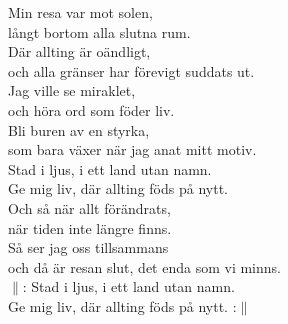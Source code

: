 \documentclass[a6paper,10pt]{article}
\begin{document}
\setlength{\oddsidemargin}{-0.47in}
\noindent
\begin{center}
\end{center}
\begin{lyrics}
Min resa var mot solen, \\
långt bortom alla slutna rum. \\
Där allting är oändligt, \\
och alla gränser har förevigt suddats ut.
\vspace{5pt} \\
Jag ville se miraklet, \\
och höra ord som föder liv. \\
Bli buren av en styrka, \\ 
som bara växer när jag anat mitt motiv.
\vspace{5pt} \\
Stad i ljus, i ett land utan namn. \\
Ge mig liv, där allting föds på nytt.
\vspace{5pt} \\
Och så när allt förändrats, \\
när tiden inte längre finns. \\
Så ser jag oss tillsammans \\
och då är resan slut, det enda som vi minns.
\vspace{5pt} \\
$\|$: Stad i ljus, i ett land utan namn. \\
Ge mig liv, där allting föds på nytt. :$\|$
\end{lyrics}
\end{document}

